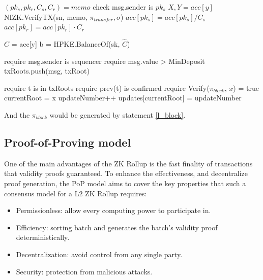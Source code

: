 \documentclass{article}
\begin{document}
\begin{algorithm}
\begin{multicols}{2}
{    $(pk_s, pk_r, C_s, C_r) = memo$ \;
    check msg.sender is $pk_s$ \;
    $X, Y = acc[y]$ \;
    NIZK.VerifyTX(sn, memo, $\pi_{transfer}, \sigma$) \;
    $acc[pk_s] = acc[pk_s]/C_s$ \;
    $acc[pk_r] = acc[pk_r]\cdot C_r$
  }

   {
    $\hat{C}$ = acc[y] \;
    b = HPKE.BalanceOf(sk, $\hat{C}$) \;
  }
  
   {
     require msg.sender is sequencer \;
     require msg.value > MinDeposit \;
     txRoots.push({msg, txRoot}) \;
  }
  
   {
    
    require t is in txRoots \;
    require prev(t) is confirmed \;
    require Verify($\pi_{block}$, $x$) = true \;
    currentRoot = x \;
    updateNumber++ \;
    updates[currentRoot] = updateNumber \;
  }
\end{multicols}

\end{algorithm}
And the $\pi_{block}$ would be generated by statement \ref{l_block}.



\subsection{Proof-of-Proving model}

One of the main advantages of the ZK Rollup is the fast finality of transactions that validity proofs guaranteed. To enhance the effectiveness, and decentralize proof generation, the PoP model aims to cover the key properties that such a consensus model for a L2 ZK Rollup requires:
\begin{itemize}
    \item Permissionless: allow every computing power to participate in.
    \item Efficiency: sorting batch and generates the batch's validity proof deterministically.
    \item Decentralization: avoid control from any single party.
    \item Security: protection from malicious attacks.
\end{itemize}
\end{document}
